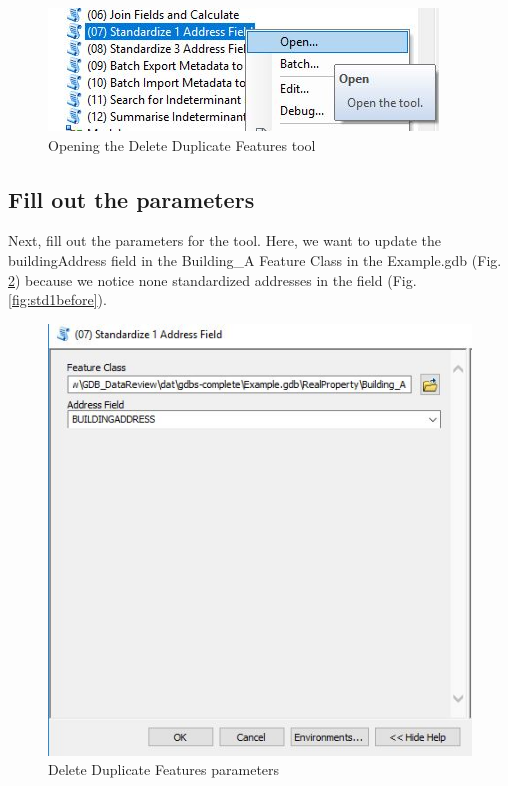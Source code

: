 \documentclass[openany]{book}
\theoremstyle{definition}
\theoremstyle{definition}
\theoremstyle{definition}
\theoremstyle{remark}
\begin{document}
\begin{figure}[H]

{\centering \includegraphics{figures/std1-opentool} 

}

\caption{Opening the Delete Duplicate Features tool}\label{fig:std1open}
\end{figure}

\subsection{Fill out the parameters}\label{fill-out-the-parameters-5}

Next, fill out the parameters for the tool. Here, we want to update the
buildingAddress field in the Building\_A Feature Class in the
Example.gdb (Fig. \ref{fig:std1params}) because we notice none
standardized addresses in the field (Fig. \ref{fig:std1before}).

\begin{figure}[H]

{\centering \includegraphics{figures/std1-toolparams} 

}

\caption{Delete Duplicate Features parameters}\label{fig:std1params}
\end{figure}
\end{document}
